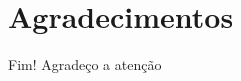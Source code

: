 \section{Agradecimentos}

\begin{frame}
	\begin{block}{Fim!}
		Agradeço a atenção
	\end{block}
\end{frame}
